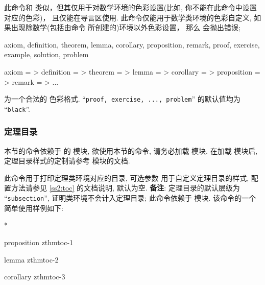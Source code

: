 \begin{function}[updated=2025-04-25]{\zthmcolorset}
  \begin{syntax}
  \end{syntax}
  此命令和 \cmd{\zcolorset} 类似，但其仅用于对数学环境的色彩设置(比如, 你不能在此命令中设置  对应的色彩)，
  且仅能在导言区使用. 此命令仅能用于数学类环境的色彩自定义, 如果出现除数学(包括由命令  所创建的)环境以外色彩设置，
  那么 \ztex{} 会抛出错误;
\end{function}


\begin{keyval}[parent=..]{
    axiom, definition, theorem, lemma, corollary, proposition, remark,
    proof, exercise, example, solution, problem
  }
  \begin{syntax}
    axiom       = >
    definition  = >
    theorem     = >
    lemma       = >
    corollary   = >
    proposition = >
    remark      = >
    ...
  \end{syntax}
   为一个合法的 \ztex{} 色彩格式. ``\texttt{proof, exercise, ..., problem}''
  的默认值均为 ``\texttt{black}''.
\end{keyval}



\clearpage
\subsubsection{定理目录}
本节的命令依赖于 \ztex{} 的  模块, 欲使用本节的命令, 请务必加载  模块. 在加载  模块后, 定理目录样式的定制请参考  模块的文档.

\begin{function}[updated=2026-02-12]{\zthmtoc}
  \begin{syntax}
  \end{syntax}
  此命令用于打印定理类环境对应的目录, 可选参数  用于自定义定理目录的样式, 配置方法请参见 \cref{ss2:toc} 的文档说明, 默认为空. \textbf{备注}: 定理目录的默认层级为 ``\texttt{subsection}'', 证明类环境不会计入定理目录; 此命令依赖于  模块. 该命令的一个简单使用样例如下:
\end{function}
\begin{DocExample}*
\zthmtoc[
  page.format+ = \texttt,
  hyper.title  = true,
]
\begin{proposition}[zthmtoc-1]proposition zthmtoc-1\end{proposition}
\begin{lemma}[zthmtoc-2]lemma zthmtoc-2\end{lemma}
\begin{corollary}[zthmtoc-3]corollary zthmtoc-3\end{corollary}
\end{DocExample}



